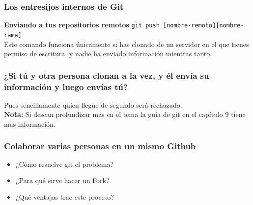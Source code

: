 \documentclass{beamer}
\begin{document}
	\begin{frame}
		\frametitle{Los entresijos internos de Git}
		\textbf{Enviando a tus repositorios remotos}
		{\tt git push [nombre-remoto][nombre-rama]}\\
		Este comando funciona únicamente si has clonado de un servidor en el que tienes permiso de escritura, y nadie ha enviado información mientras tanto. 
	\end{frame}
	\begin{frame}
		\frametitle{¿Si tú y otra persona clonan a la vez, y él envía su información y luego envías tú?}
		Pues sencillamente quien llegue de segundo será rechazado.
		\\[8]
		\textbf{Nota: } Si desean profundizar mas en el tema la guía de git en el capítulo 9 tiene mas información.
	\end{frame}	
	\begin{frame}
		\frametitle{Colaborar varias personas en un mismo Github}
		\begin{itemize}
			\item ¿Cómo resuelve git el problema?
			\item ¿Para qué sirve hacer un Fork?
			\item ¿Qué ventajas trae este proceso?
		\end{itemize}
	\end{frame}	
\end{document}
